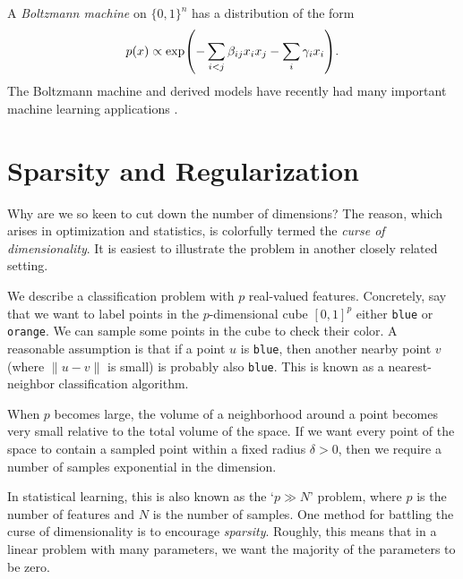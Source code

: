 \documentclass[cclicense]{hmcthesis}
\numberwithin{equation}{chapter}
\numberwithin{ucounter}{chapter}
\begin{document}
    \begin{example}
        A \emph{Boltzmann machine} on $\{0, 1\}^n$ has a distribution of the
        form
        \[
            p(x) \propto \exp\pdel*{-\sum_{i < j} \beta_{ij} x_i x_j  - \sum_i
            \gamma_i x_i}.
        \]
        The Boltzmann machine and derived models have recently had many
        important machine learning applications \citep{Hin07}.
        \label{ex:boltz}
    \end{example}

\section{Sparsity and Regularization}
    \label{sec:regularization}

    Why are we so keen to cut down the number of dimensions?  The reason, which
    arises in optimization and statistics, is colorfully termed the \emph{curse
    of dimensionality}.  It is easiest to illustrate the problem in another
    closely related setting.

    \begin{example}
        We describe a classification problem with $p$ real-valued features.
        Concretely, say that we want to label points in the $p$-dimensional cube
        $[0, 1]^p$ either \texttt{blue} or \texttt{orange}.  We can sample some
        points in the cube to check their color.  A reasonable assumption is
        that if a point $u$ is \texttt{blue}, then another nearby point $v$
        (where $\|u - v\|$ is small) is probably also \texttt{blue}.  This is
        known as a nearest-neighbor classification algorithm.  
        
        When $p$ becomes large, the volume of a neighborhood around a point
        becomes very small relative to the total volume of the space.  If we
        want every point of the space to contain a sampled point within a fixed
        radius $\delta > 0$, then we require a number of samples exponential in
        the dimension.
    \end{example}

    In statistical learning, this is also known as the `$p \gg N$' problem,
    where $p$ is the number of features and $N$ is the number of samples.  One
    method for battling the curse of dimensionality is to encourage
    \emph{sparsity}.  Roughly, this means that in a linear problem with many
    parameters, we want the majority of the parameters to be zero.
    
\end{document}
